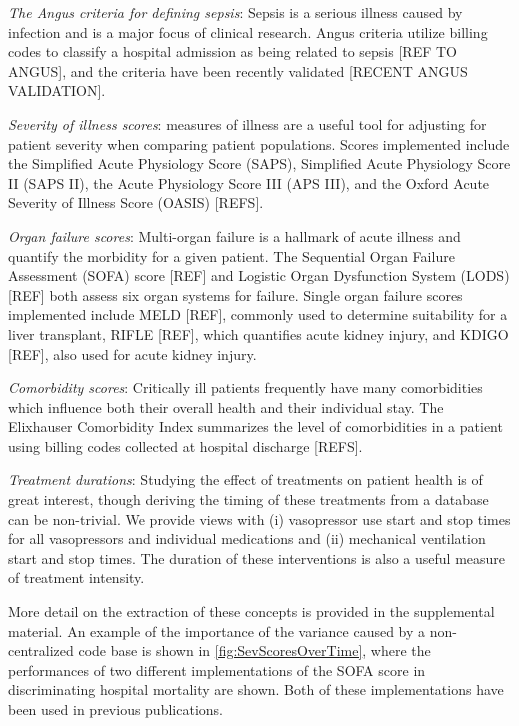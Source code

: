\documentclass{elsart}
\begin{document}
\emph{The Angus criteria for defining sepsis}: Sepsis is a serious illness caused by infection and is a major focus of clinical research. Angus criteria utilize billing codes to classify a hospital admission as being related to sepsis [REF TO ANGUS], and the criteria have been recently validated [RECENT ANGUS VALIDATION].

\emph{Severity of illness scores}: measures of illness are a useful tool for adjusting for patient severity when comparing patient populations. Scores implemented include the Simplified Acute Physiology Score (SAPS), Simplified Acute Physiology Score II (SAPS II), the Acute Physiology Score III (APS III), and the Oxford Acute Severity of Illness Score (OASIS) [REFS].

\emph{Organ failure scores}: Multi-organ failure is a hallmark of acute illness and quantify the morbidity for a given patient. The Sequential Organ Failure Assessment (SOFA) score [REF] and Logistic Organ Dysfunction System (LODS) [REF] both assess six organ systems for failure. Single organ failure scores implemented include MELD [REF], commonly used to determine suitability for a liver transplant, RIFLE [REF], which quantifies acute kidney injury, and KDIGO [REF], also used for acute kidney injury.

\emph{Comorbidity scores}: Critically ill patients frequently have many comorbidities which influence both their overall health and their individual stay. The Elixhauser Comorbidity Index summarizes the level of comorbidities in a patient using billing codes collected at hospital discharge [REFS].

\emph{Treatment durations}: Studying the effect of treatments on patient health is of great interest, though deriving the timing of these treatments from a database can be non-trivial. We provide views with (i) vasopressor use start and stop times for all vasopressors and individual medications and (ii) mechanical ventilation start and stop times. The duration of these interventions is also a useful measure of treatment intensity.

More detail on the extraction of these concepts is provided in the supplemental material.
An example of the importance of the variance caused by a non-centralized code base is shown in \ref{fig:SevScoresOverTime}, where the performances of two different implementations of the SOFA score in discriminating hospital mortality are shown. Both of these implementations have been used in previous publications.

\end{document}
